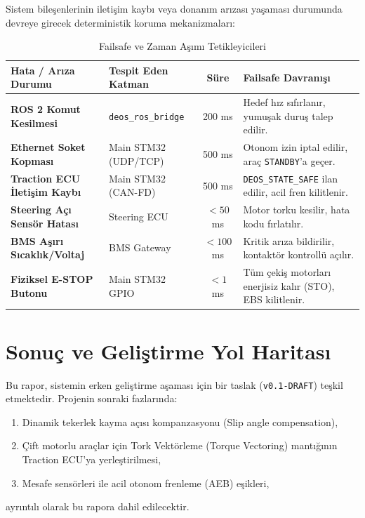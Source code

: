 \documentclass[a4paper,11pt]{article}
\begin{document}
Sistem bileşenlerinin iletişim kaybı veya donanım arızası yaşaması durumunda devreye girecek deterministik koruma mekanizmaları:

\begin{table}[h]
\centering
\small
\begin{tabularx}{\textwidth}{|L{4.5cm}|L{3.0cm}|c|Y|}
\hline
\textbf{Hata / Arıza Durumu} & \textbf{Tespit Eden Katman} & \textbf{Süre} & \textbf{Failsafe Davranışı} \\
\hline
\textbf{ROS 2 Komut Kesilmesi} & \texttt{deos\_ros\_bridge} & 200 ms & Hedef hız sıfırlanır, yumuşak duruş talep edilir. \\
\hline
\textbf{Ethernet Soket Kopması} & Main STM32 (UDP/TCP) & 500 ms & Otonom izin iptal edilir, araç \texttt{STANDBY}'a geçer. \\
\hline
\textbf{Traction ECU İletişim Kaybı} & Main STM32 (CAN-FD) & 500 ms & \texttt{DEOS\_STATE\_SAFE} ilan edilir, acil fren kilitlenir. \\
\hline
\textbf{Steering Açı Sensör Hatası} & Steering ECU & $<50$ ms & Motor torku kesilir, hata kodu fırlatılır. \\
\hline
\textbf{BMS Aşırı Sıcaklık/Voltaj} & BMS Gateway & $<100$ ms & Kritik arıza bildirilir, kontaktör kontrollü açılır. \\
\hline
\textbf{Fiziksel E-STOP Butonu} & Main STM32 GPIO & $<1$ ms & Tüm çekiş motorları enerjisiz kalır (STO), EBS kilitlenir. \\
\hline
\end{tabularx}
\caption{Failsafe ve Zaman Aşımı Tetikleyicileri}
\end{table}

\section{Sonuç ve Geliştirme Yol Haritası}

Bu rapor, sistemin erken geliştirme aşaması için bir taslak (\texttt{v0.1-DRAFT}) teşkil etmektedir. Projenin sonraki fazlarında:
\begin{enumerate}
    \item Dinamik tekerlek kayma açısı kompanzasyonu (Slip angle compensation),
    \item Çift motorlu araçlar için Tork Vektörleme (Torque Vectoring) mantığının Traction ECU'ya yerleştirilmesi,
    \item Mesafe sensörleri ile acil otonom frenleme (AEB) eşikleri,
\end{enumerate}
ayrıntılı olarak bu rapora dahil edilecektir.
\end{document}
